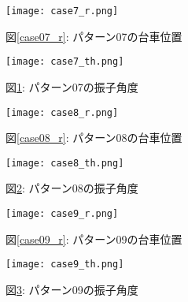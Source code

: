 \begin{figure}[htbp]
    \begin{minipage}{0.5\hsize}
        \begin{center}
            \texttt{[image: case7\_r.png]}
            \caption{図\ref{case07_r}: パターン07の台車位置}
            \label{case07_r}
        \end{center}
    \end{minipage}
    \begin{minipage}{0.5\hsize}
        \begin{center}
            \texttt{[image: case7\_th.png]}
            \caption{図\ref{case07_th}: パターン07の振子角度}
            \label{case07_th}
        \end{center}
    \end{minipage}
\end{figure}

\begin{figure}[htbp]
    \begin{minipage}{0.5\hsize}
        \begin{center}
            \texttt{[image: case8\_r.png]}
            \caption{図\ref{case08_r}: パターン08の台車位置}
            \label{case08_r}
        \end{center}
    \end{minipage}
    \begin{minipage}{0.5\hsize}
        \begin{center}
            \texttt{[image: case8\_th.png]}
            \caption{図\ref{case08_th}: パターン08の振子角度}
            \label{case08_th}
        \end{center}
    \end{minipage}
\end{figure}

\begin{figure}[htbp]
    \begin{minipage}{0.5\hsize}
        \begin{center}
            \texttt{[image: case9\_r.png]}
            \caption{図\ref{case09_r}: パターン09の台車位置}
            \label{case09_r}
        \end{center}
    \end{minipage}
    \begin{minipage}{0.5\hsize}
        \begin{center}
            \texttt{[image: case9\_th.png]}
            \caption{図\ref{case09_th}: パターン09の振子角度}
            \label{case09_th}
        \end{center}
    \end{minipage}
\end{figure}

